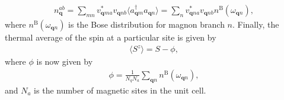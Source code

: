 \documentclass[aps,prb,reprint,floatfix,superscriptaddress]{revtex4-2}
\begin{document}
\begin{align}
    n^{ab}_\mathbf{q}=\sum_{mn}v_{\mathbf{q}ma}^*v_{\mathbf{q}nb}\langle a^\dag_{\mathbf{q}m}a_{\mathbf{q}n}\rangle=\sum_{n}v_{\mathbf{q}na}^*v_{\mathbf{q}nb}n^\mathrm{B}(\omega_{\mathbf{q}n}),
\end{align}
where $n^\mathrm{B}(\omega_{\mathbf{q}n})$ is the Bose distribution for magnon branch $n$. 
Finally, the thermal average of the spin at a particular site is given by
\begin{align}
    \langle S^z\rangle=S-\phi,
\end{align}
where $\phi$ is now given by
\begin{align}\label{eq:phi_multiple}
    \phi=\frac{1}{N_qN_a}\sum_{\mathbf{q}n}n^\mathrm{B}(\omega_{\mathbf{q}n}),
\end{align}
and $N_a$ is the number of magnetic sites in the unit cell.
\end{document}
